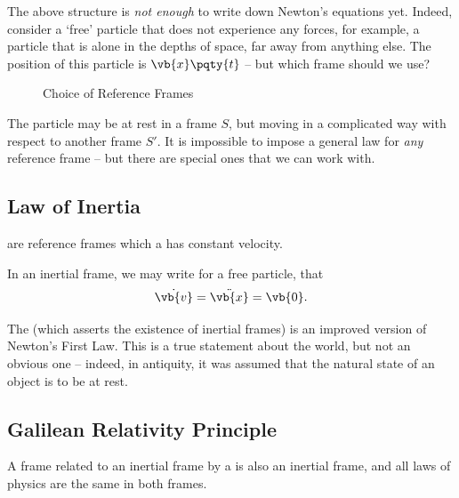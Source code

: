 The above structure is \emph{not enough} to write down Newton's equations yet. Indeed, consider a `free' particle that does not experience any forces, for example, a particle that is alone in the depths of space, far away from anything else. The position of this particle is \(\vb{x}\pqty{t}\) -- but which frame should we use?

\begin{figure}[ht!]
    \centering
    \caption{Choice of Reference Frames}
    \label{fig:choice-of-reference-frame}%
\end{figure}

The particle may be at rest in a frame \(S\), but moving in a complicated way with respect to another frame \(S'\). It is impossible to impose a general law for \emph{any} reference frame -- but there are special ones that we can work with.

\subsection{Law of Inertia}

\begin{definition}
    \label{def:inertial-frame}%
     are reference frames which a  has constant velocity.
\end{definition}

In an inertial frame, we may write for a free particle, that
\begin{equation}
    \dot{\vb{v}} = \ddot{\vb{x}} = \vb{0}.
\end{equation}

The  (which asserts the existence of inertial frames) is an improved version of Newton's First Law. This is a true statement about the world, but not an obvious one -- indeed, in antiquity, it was assumed that the natural state of an object is to be at rest.

\subsection{Galilean Relativity Principle}

\begin{theorem}
    \label{thm:galilean-relativity-principle}%
    A frame related to an inertial frame by a  is also an inertial frame, and all laws of physics are the same in both frames.
\end{theorem}

